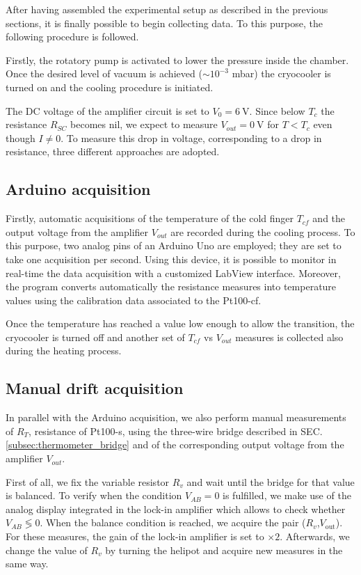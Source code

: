 \documentclass[rmp,10pt,onecolumn,fleqn,notitlepage]{revtex4-1}
\begin{document}
After having assembled the experimental setup as described in the previous sections, it is finally possible to begin collecting data. To this purpose, the following procedure is followed. 

Firstly, the rotatory pump is activated to lower the pressure inside the chamber. Once the desired level of vacuum is achieved ($\sim 10^{-3}$ \si{\milli \bar}) the cryocooler is turned on and the cooling procedure is initiated. 

The DC voltage of the amplifier circuit is set to $V_0=\SI{6}{\V}$. Since below $T_c$ the resistance $R_{SC}$ becomes nil, we expect to measure $V_{out} = \SI{0}{\volt}$ for $T < T_c$ even though $I \neq 0$. 
To measure this drop in voltage, corresponding to a drop in resistance, three different approaches are adopted.

\subsection{Arduino acquisition}
\label{subsec:arduino_acquisition}
Firstly, automatic acquisitions of the temperature of the cold finger $T_{cf}$ and the output voltage from the amplifier $V_{out}$ are recorded during the cooling process.
To this purpose, two analog pins of an Arduino Uno are employed; they are set to take one acquisition per second. Using this device, it is possible to monitor in real-time the data acquisition with a customized LabView interface. Moreover, the program converts automatically the resistance measures into temperature values using the calibration data associated to the Pt100-cf. 

Once the temperature has reached a value low enough to allow the transition, the cryocooler is turned off and another set of $T_{cf}$ vs $V_{out}$ measures is collected also during the heating process.

\subsection{Manual drift acquisition}
\label{subsec:manual_drift_acquisition}
In parallel with the Arduino acquisition, we also perform manual measurements of $R_T$, resistance of Pt100-s, using the three-wire bridge described in SEC. \ref{subsec:thermometer_bridge} and of the corresponding output voltage from the amplifier $V_{out}$.

First of all, we fix the variable resistor $R_v$ and wait until the bridge for that value is balanced. To verify when the condition $V_{AB} = 0$ is fulfilled, we make use of the analog display integrated in the lock-in amplifier which allows to check whether $V_{AB}  \lessgtr 0$. When the balance condition is reached, we acquire the pair ($R_v$,$V_{\text{out}}$). For these measures, the gain of the lock-in amplifier is set to $\times 2$. 
Afterwards, we change the value of $R_v$ by turning the helipot and acquire new measures in the same way.
\end{document}

